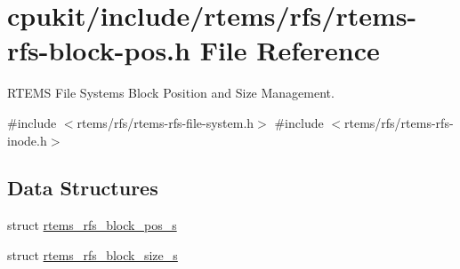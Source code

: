 \hypertarget{rtems-rfs-block-pos_8h}{}\section{cpukit/include/rtems/rfs/rtems-\/rfs-\/block-\/pos.h File Reference}
\label{rtems-rfs-block-pos_8h}


R\+T\+E\+MS File Systems Block Position and Size Management.  


{\ttfamily \#include $<$rtems/rfs/rtems-\/rfs-\/file-\/system.\+h$>$}\newline
{\ttfamily \#include $<$rtems/rfs/rtems-\/rfs-\/inode.\+h$>$}\newline
\subsection*{Data Structures}
\begin{DoxyCompactItemize}
\item 
struct \mbox{\hyperlink{structrtems__rfs__block__pos__s}{rtems\+\_\+rfs\+\_\+block\+\_\+pos\+\_\+s}}
\item 
struct \mbox{\hyperlink{structrtems__rfs__block__size__s}{rtems\+\_\+rfs\+\_\+block\+\_\+size\+\_\+s}}
\end{DoxyCompactItemize}
